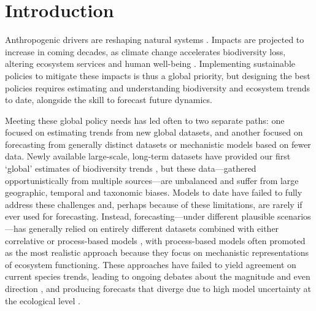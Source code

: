 \documentclass[11pt]{article}
\newcommand{\llabel}[1]{\hypertarget{lintarget:#1}{}\linelabel{lin:#1}}
\begin{document}
\begin{abstract}
\end{abstract}

\linenumbers

\section{Introduction}

Anthropogenic drivers are reshaping natural systems \citep{Diaz2019}. Impacts are projected to increase in coming decades, as climate change accelerates biodiversity loss, altering ecosystem services and human well-being \citep{IPBES2019}.
Implementing sustainable policies to mitigate these impacts is thus a global priority, but designing the best policies requires estimating and understanding biodiversity and ecosystem trends to date, alongside the skill to forecast future dynamics. %

Meeting these \llabel{global}global policy needs has led often to two separate paths: one focused on estimating trends from new global datasets, and another focused on forecasting from generally distinct datasets or mechanistic models based on fewer data. 
Newly available large-scale, long-term datasets have provided our first `global' estimates of biodiversity trends \citep[e.g.][]{loh2005living,Dornelas2018}, but these data---gathered opportunistically from multiple sources---are unbalanced and suffer from large geographic, temporal and taxonomic biases. Models to date have failed to fully address these challenges and, perhaps because of these limitations, are rarely if ever used for forecasting.
Instead, forecasting---under different plausible scenarios---has generally relied on entirely different datasets combined with either correlative or process-based models \citep{IPBES2019}, with process-based models often promoted as the most realistic approach \citep{Urban2016, Pilowsky2022} because they focus on mechanistic representations of ecosystem functioning. These approaches have failed to yield agreement on current species trends, leading to ongoing debates about the magnitude and even direction \citep{Dornelas2014, Leung2020, Buschke2021, Johnson2024}, and producing forecasts that diverge due to high model uncertainty at the ecological level \citep{Cheaib2012, Thuiller2019}.
 
\end{document}
